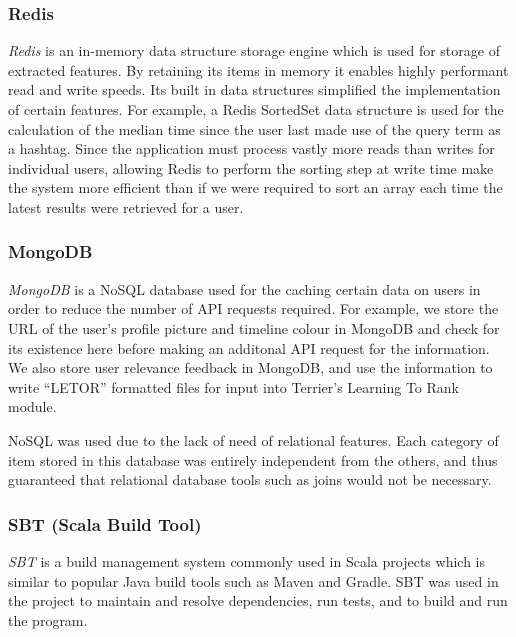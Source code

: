 \documentclass{l4proj}
\begin{document}

        \subsubsection{Redis}
        \textit{Redis} is an in-memory data structure storage engine which is used for storage of extracted features. By retaining its items in memory it enables highly performant read and write speeds. Its built in data structures simplified the implementation of certain features. For example, a Redis SortedSet data structure is used for the calculation of the median time since the user last made use of the query term as a hashtag. Since the application must process vastly more reads than writes for individual users, allowing Redis to perform the sorting step at write time make the system more efficient than if we were required to sort an array each time the latest results were retrieved for a user.
        
         \subsubsection{MongoDB}
         \textit{MongoDB} is a NoSQL database used for the caching certain data on users in order to reduce the number of API requests required. For example, we store the URL of the user's profile picture and timeline colour in MongoDB and check for its existence here before making an additonal API request for the information. We also store user relevance feedback in MongoDB, and use the information to write ``LETOR'' formatted files for input into Terrier's Learning To Rank module.
         
         NoSQL was used due to the lack of need of relational features. Each category of item stored in this database was entirely independent from the others, and thus guaranteed that relational database tools such as joins would not be necessary.
         
         \subsubsection{SBT (Scala Build Tool)}
         \textit{SBT} is a build management system commonly used in Scala projects which is similar to popular Java build tools such as Maven and Gradle. SBT was used in the project to maintain and resolve dependencies, run tests, and to build and run the program.
         
\end{document}
